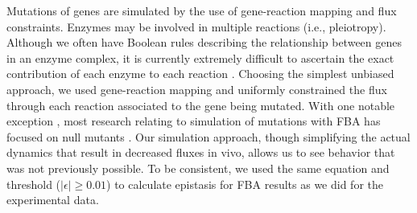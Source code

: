 Mutations of genes are simulated by the use of gene-reaction mapping
and flux constraints. Enzymes may be involved in multiple reactions
(i.e., pleiotropy). Although we often have Boolean rules describing
the relationship between genes in an enzyme complex, it is currently
extremely difficult to ascertain the exact contribution of each enzyme
to each reaction \citep{Banta2007}. Choosing the simplest unbiased approach, we
used gene-reaction mapping and uniformly constrained the flux through
each reaction associated to the gene being mutated. With one notable
exception \citep{He2010}, most research relating to simulation of
mutations with FBA has focused on null mutants \citep{Papp2004,
Ibarra2002, Harrison2007, Deutscher2006, Segre2005, Edwards2001,
Segre2002_sb2013}. Our simulation
approach, though simplifying the actual dynamics that result in
decreased fluxes in vivo, allows us to see behavior that was not
previously possible. To be consistent, we used the same equation and
threshold ($\left|\epsilon\right| \geq 0.01$) to calculate epistasis
for FBA results as we did for the experimental data.

